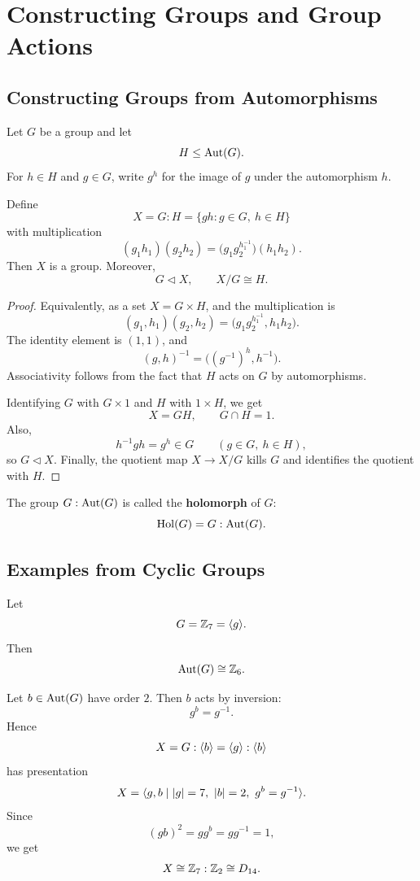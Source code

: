 \chapter{Constructing Groups and Group Actions}

\section{Constructing Groups from Automorphisms}

\begin{proposition}
Let $G$ be a group and let
\[
    H\leq \operatorname{Aut}(G).
\]
For $h\in H$ and $g\in G$, write $g^h$ for the image of $g$ under the automorphism $h$.

Define
\[
    X=G:H=\{gh:g\in G,\ h\in H\}
\]
with multiplication
\[
    (g_1h_1)(g_2h_2)
    =
    \bigl(g_1g_2^{h_1^{-1}}\bigr)(h_1h_2).
\]
Then $X$ is a group. Moreover,
\[
    G\lhd X,
    \qquad
    X/G\cong H.
\]
\end{proposition}

\begin{proof}
Equivalently, as a set $X=G\times H$, and the multiplication is
\[
    (g_1,h_1)(g_2,h_2)
    =
    \bigl(g_1g_2^{h_1^{-1}},h_1h_2\bigr).
\]
The identity element is $(1,1)$, and
\[
    (g,h)^{-1}
    =
    \bigl((g^{-1})^h,h^{-1}\bigr).
\]
Associativity follows from the fact that $H$ acts on $G$ by automorphisms.

Identifying $G$ with $G\times 1$ and $H$ with $1\times H$, we get
\[
    X=GH,
    \qquad
    G\cap H=1.
\]
Also,
\[
    h^{-1}gh=g^h\in G
    \qquad(g\in G,\ h\in H),
\]
so $G\lhd X$. Finally, the quotient map $X\to X/G$ kills $G$ and identifies the quotient with $H$.
\end{proof}

\begin{remark}
The group $G:\operatorname{Aut}(G)$ is called the \textbf{holomorph} of $G$:
\[
    \operatorname{Hol}(G)=G:\operatorname{Aut}(G).
\]
\end{remark}

\section{Examples from Cyclic Groups}

\begin{example}
Let
\[
    G=\mathbb{Z}_7=\langle g\rangle.
\]
Then
\[
    \operatorname{Aut}(G)\cong \mathbb{Z}_6.
\]

Let $b\in\operatorname{Aut}(G)$ have order $2$. Then $b$ acts by inversion:
\[
    g^b=g^{-1}.
\]
Hence
\[
    X=G:\langle b\rangle
    =
    \langle g\rangle:\langle b\rangle
\]
has presentation
\[
    X=
    \langle g,b\mid |g|=7,\ |b|=2,\ g^b=g^{-1}\rangle.
\]
Since
\[
    (gb)^2=gg^b=g g^{-1}=1,
\]
we get
\[
    X\cong \mathbb{Z}_7:\mathbb{Z}_2\cong D_{14}.
\]
\end{example}

